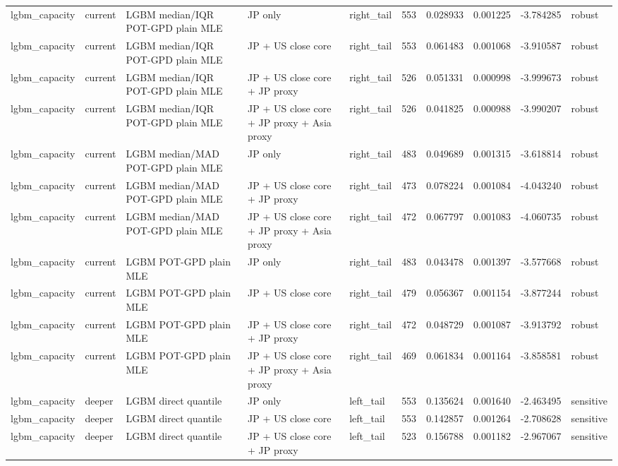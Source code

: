 \begin{tabular}{lll l lrrrrl}
lgbm\_capacity & current & LGBM median/IQR POT-GPD plain MLE & JP only & right\_tail & 553 & 0.028933 & 0.001225 & -3.784285 & robust \\
lgbm\_capacity & current & LGBM median/IQR POT-GPD plain MLE & JP + US close core & right\_tail & 553 & 0.061483 & 0.001068 & -3.910587 & robust \\
lgbm\_capacity & current & LGBM median/IQR POT-GPD plain MLE & JP + US close core + JP proxy & right\_tail & 526 & 0.051331 & 0.000998 & -3.999673 & robust \\
lgbm\_capacity & current & LGBM median/IQR POT-GPD plain MLE & JP + US close core + JP proxy + Asia proxy & right\_tail & 526 & 0.041825 & 0.000988 & -3.990207 & robust \\
lgbm\_capacity & current & LGBM median/MAD POT-GPD plain MLE & JP only & right\_tail & 483 & 0.049689 & 0.001315 & -3.618814 & robust \\
lgbm\_capacity & current & LGBM median/MAD POT-GPD plain MLE & JP + US close core + JP proxy & right\_tail & 473 & 0.078224 & 0.001084 & -4.043240 & robust \\
lgbm\_capacity & current & LGBM median/MAD POT-GPD plain MLE & JP + US close core + JP proxy + Asia proxy & right\_tail & 472 & 0.067797 & 0.001083 & -4.060735 & robust \\
lgbm\_capacity & current & LGBM POT-GPD plain MLE & JP only & right\_tail & 483 & 0.043478 & 0.001397 & -3.577668 & robust \\
lgbm\_capacity & current & LGBM POT-GPD plain MLE & JP + US close core & right\_tail & 479 & 0.056367 & 0.001154 & -3.877244 & robust \\
lgbm\_capacity & current & LGBM POT-GPD plain MLE & JP + US close core + JP proxy & right\_tail & 472 & 0.048729 & 0.001087 & -3.913792 & robust \\
lgbm\_capacity & current & LGBM POT-GPD plain MLE & JP + US close core + JP proxy + Asia proxy & right\_tail & 469 & 0.061834 & 0.001164 & -3.858581 & robust \\
lgbm\_capacity & deeper & LGBM direct quantile & JP only & left\_tail & 553 & 0.135624 & 0.001640 & -2.463495 & sensitive \\
lgbm\_capacity & deeper & LGBM direct quantile & JP + US close core & left\_tail & 553 & 0.142857 & 0.001264 & -2.708628 & sensitive \\
lgbm\_capacity & deeper & LGBM direct quantile & JP + US close core + JP proxy & left\_tail & 523 & 0.156788 & 0.001182 & -2.967067 & sensitive \\

\end{tabular}
